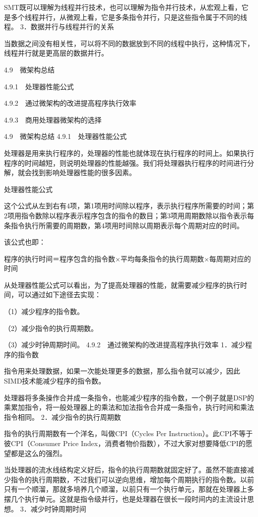 \documentclass[12pt,UTF8]{ctexbook}
\begin{document}
SMT既可以理解为线程并行技术，也可以理解为指令并行技术，从宏观上看，它是多个线程并行，从微观上看，它是多条指令并行，只是这些指令属于不同的线程。
3．数据并行与线程并行的关系

当数据之间没有相关性，可以将不同的数据放到不同的线程中执行，这种情况下，线程并行就是更高层的数据并行。


4.9　微架构总结

4.9.1　处理器性能公式

4.9.2　通过微架构的改进提高程序执行效率

4.9.3　商用处理器微架构的选择


4.9　微架构总结
4.9.1　处理器性能公式

处理器是用来执行程序的，处理器的性能也就体现在执行程序的时间上。如果执行程序的时间越短，则说明处理器的性能越强。我们将处理器执行程序的时间进行分解，就会找到影响处理器性能的很多因素。

处理器性能公式

这个公式从左到右有4项，第1项用时间除以程序，表示执行程序所需要的时间；第2项用指令数除以程序表示程序包含的指令的数目；第3项用周期数除以指令表示每条指令执行所需要的周期数，第4项用时间除以周期表示每个周期对应的时间。

该公式也即：

程序的执行时间＝程序包含的指令数×平均每条指令的执行周期数×每周期对应的时间

从处理器性能公式可以看出，为了提高处理器的性能，就需要减少程序的执行时间，可以通过如下途径去实现：

（1）减少程序的指令数。

（2）减少指令的执行周期数。

（3）减少时钟周期时间。
4.9.2　通过微架构的改进提高程序执行效率
1．减少程序的指令数

指令用来处理数据，如果一次能处理更多的数据，那么指令就可以减少，因此SIMD技术能减少程序的指令数。

处理器将多条操作合并成一条指令，也能减少程序的指令数，一个例子就是DSP的乘累加指令，将一般处理器上的乘法和加法指令合并成一条指令，执行时间和乘法指令相同。
2．减少指令的执行周期数

指令的执行周期数有一个洋名，叫做CPI（Cycles Per Instruction）。此CPI不等于彼CPI（Consumer Price Index，消费者物价指数），不过大家对想要降低CPI的愿望都是这么的强烈。

当处理器的流水线结构定义好后，指令的执行周期数就固定好了。虽然不能直接减少指令的执行周期数，不过我们可以逆向思维，增加每个周期执行的指令数。以前只有一个顺溜，那就多培养几个顺溜，以前只有一个执行单元，那就在处理器上多摆几个执行单元。这就是指令级并行，也是处理器在很长一段时间内的主流设计思想。
3．减少时钟周期时间
\end{document}
